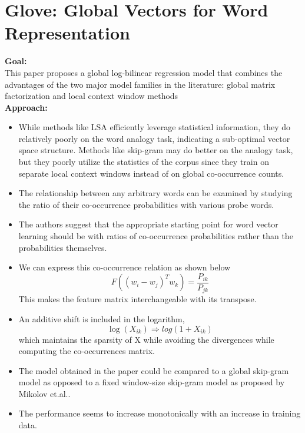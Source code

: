 \documentclass[11pt,a4paper]{article}
\begin{document}


\section{Glove: Global Vectors for Word Representation} %
\label{sec:glove_global_vectors_for_word_representation}

  \textbf{Goal:}\\
  This paper proposes a global log-bilinear regression model that combines the advantages of the two major model families in the literature: global matrix factorization and local context window methods\\

  \textbf{Approach:}
  \begin{itemize}
    \item 
    While methods like LSA efficiently leverage statistical information, they do relatively poorly on the word analogy task, indicating a sub-optimal vector space structure. Methods like skip-gram may do better on the analogy task, but they poorly utilize the statistics of the corpus since they train on separate local context windows instead of on global co-occurrence counts.
    \item 
    The relationship between any arbitrary words can be examined by studying the ratio of their co-occurrence probabilities with various probe words.
    \item 
    The authors suggest that the appropriate starting point for word vector learning should be with ratios of co-occurrence probabilities rather than the probabilities themselves.
    \item 
    We can express this co-occurrence relation as shown below
    $$F((w_i - w_j)^T w_k) = \frac{P_{ik}}{P_{jk}}$$
    This makes the feature matrix interchangeable with its transpose.
    \item 
    An additive shift is included in the logarithm, $$\log(X_{ik}) \Rightarrow log(1 + X_{ik})$$ which maintains the sparsity of X while avoiding the divergences while computing the co-occurrences matrix.
    \item 
    The model obtained in the paper could be compared to a global skip-gram model as opposed to a fixed window-size skip-gram model as proposed by Mikolov et.al.\cite{mikolov2013efficient}.
    \item 
    The performance seems to increase monotonically with an increase in training data.
  \end{itemize}
\end{document}
